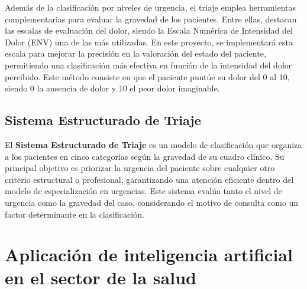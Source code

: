 Además de la clasificación por niveles de urgencia, el triaje emplea herramientas complementarias para evaluar la gravedad de los pacientes. Entre ellas, destacan las escalas de evaluación del dolor, siendo la Escala Numérica de Intensidad del Dolor (ENV) una de las más utilizadas. En este proyecto, se implementará esta escala para mejorar la precisión en la valoración del estado del paciente, permitiendo una clasificación más efectiva en función de la intensidad del dolor percibido.
Este método consiste en que el paciente puntúe su dolor del 0 al 10, siendo 0 la ausencia de dolor y 10 el peor dolor imaginable. \cite{EscalaDolorCM}
\subsection{Sistema Estructurado de Triaje}

El \textbf{Sistema Estructurado de Triaje} es un modelo de clasificación que organiza a los pacientes en cinco categorías según la gravedad de su cuadro clínico. Su principal objetivo es priorizar la urgencia del paciente sobre cualquier otro criterio estructural o profesional, garantizando una atención eficiente dentro del modelo de especialización en urgencias. Este sistema evalúa tanto el nivel de urgencia como la gravedad del caso, considerando el motivo de consulta como un factor determinante en la clasificación. \cite{SET_triaje}\cite{triaje_espana}

\section{Aplicación de inteligencia artificial en el sector de la salud}

